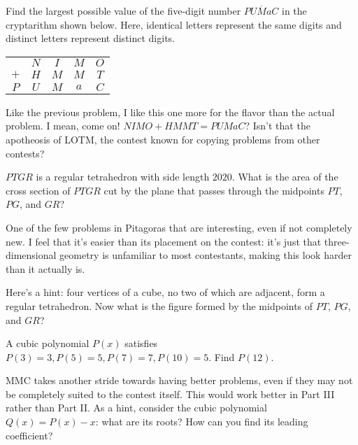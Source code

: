 \documentclass[11pt,paper=letter]{scrartcl}
\begin{document}
\begin{probboxed}
   Find the largest possible value of the five-digit number $\overline{PUMaC}$ in the cryptarithm shown below. Here, identical letters represent the same digits and distinct letters represent distinct digits.
  \begin{center}
    \begin{tabular}{ccccc}
      & $N$ & $I$ & $M$ & $O$ \\
      $+$ & $H$ & $M$ & $M$ & $T$ \\ \hline
      $P$ & $U$ & $M$ & $a$ & $C$
    \end{tabular}
  \end{center}
\end{probboxed}

Like the previous problem, I like this one more for the flavor than the actual problem. I mean, come on! $NIMO + HMMT = PUMaC$? Isn't that the apotheosis of LOTM, the contest known for copying problems from other contests?

\begin{probboxed}
   $PTGR$ is a regular tetrahedron with side length $2020$. What is the area of the cross section of $PTGR$ cut by the plane that passes through the midpoints $PT$, $PG$, and $GR$?
\end{probboxed}

One of the few problems in Pitagoras that are interesting, even if not completely new. I feel that it's easier than its placement on the contest: it's just that three-dimensional geometry is unfamiliar to most contestants, making this look harder than it actually is.

Here's a hint: four vertices of a cube, no two of which are adjacent, form a regular tetrahedron. Now what is the figure formed by the midpoints of $PT$, $PG$, and $GR$? 

\begin{probboxed}
   A cubic polynomial $P(x)$ satisfies $P(3)=3,P(5)=5,P(7)=7,P(10)=5$. Find $P(12)$.
\end{probboxed}

MMC takes another stride towards having better problems, even if they may not be completely suited to the contest itself. This would work better in Part III rather than Part II. As a hint, consider the cubic polynomial $Q(x) = P(x) - x$: what are its roots? How can you find its leading coefficient?
\end{document}
